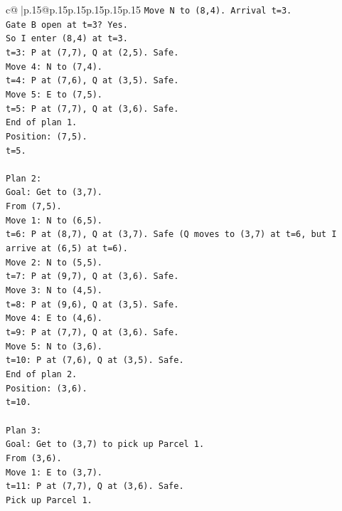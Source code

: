 \documentclass{article}
\begin{document}
{\begin{supertabular}{c@{$\;$}|p{.15\linewidth}@{}p{.15\linewidth}p{.15\linewidth}p{.15\linewidth}p{.15\linewidth}p{.15\linewidth}}
{{{\texttt{Move N to (8,4). Arrival t=3.} \\
\texttt{Gate B open at t=3? Yes.} \\
\texttt{So I enter (8,4) at t=3.} \\
\texttt{t=3: P at (7,7), Q at (2,5). Safe.} \\
\texttt{Move 4: N to (7,4).} \\
\texttt{t=4: P at (7,6), Q at (3,5). Safe.} \\
\texttt{Move 5: E to (7,5).} \\
\texttt{t=5: P at (7,7), Q at (3,6). Safe.} \\
\texttt{End of plan 1.} \\
\texttt{Position: (7,5).} \\
\texttt{t=5.} \\
\\ 
\texttt{Plan 2:} \\
\texttt{Goal: Get to (3,7).} \\
\texttt{From (7,5).} \\
\texttt{Move 1: N to (6,5).} \\
\texttt{t=6: P at (8,7), Q at (3,7). Safe (Q moves to (3,7) at t=6, but I arrive at (6,5) at t=6).} \\
\texttt{Move 2: N to (5,5).} \\
\texttt{t=7: P at (9,7), Q at (3,6). Safe.} \\
\texttt{Move 3: N to (4,5).} \\
\texttt{t=8: P at (9,6), Q at (3,5). Safe.} \\
\texttt{Move 4: E to (4,6).} \\
\texttt{t=9: P at (7,7), Q at (3,6). Safe.} \\
\texttt{Move 5: N to (3,6).} \\
\texttt{t=10: P at (7,6), Q at (3,5). Safe.} \\
\texttt{End of plan 2.} \\
\texttt{Position: (3,6).} \\
\texttt{t=10.} \\
\\ 
\texttt{Plan 3:} \\
\texttt{Goal: Get to (3,7) to pick up Parcel 1.} \\
\texttt{From (3,6).} \\
\texttt{Move 1: E to (3,7).} \\
\texttt{t=11: P at (7,7), Q at (3,6). Safe.} \\
\texttt{Pick up Parcel 1.} \\
}}}
\end{supertabular}}
\end{document}

